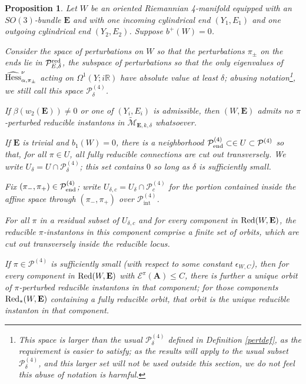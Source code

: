 \documentclass{memo-l}
\newtheorem{proposition}[theorem]{Proposition}
\theoremstyle{definition}
\theoremstyle{remark}
\numberwithin{section}{chapter}
\numberwithin{equation}{chapter}
\begin{document}
\begin{proposition}\label{red-solutions-nobplus}Let $W$ be an oriented Riemannian 4-manifold equipped with an $SO(3)$-bundle $\mathbf{E}$ and with one incoming cylindrical end $(Y_1,E_1)$ and one outgoing cylindrical end $(Y_2, E_2)$. Suppose $b^+(W) = 0$.

Consider the space of perturbations on $W$ so that the perturbations $\pi_\pm$ on the ends lie in $\mathcal P^{\textup{red}}_{E,\delta}$, the subspace of perturbations so that the only eigenvalues of $\widehat{\textup{Hess}}^\nu_{\alpha, \pi_\pm}$ acting on $\Omega^1(Y;i\mathbb R)$ have absolute value at least $\delta$; abusing notation\footnote{This space is larger than the usual $\mathcal P^{(4)}_\delta$ defined in Definition \ref{pertdef}, as the requirement is easier to satisfy; as the results will apply to the usual subset $\mathcal P^{(4)}_\delta$, and this larger set will not be used outside this section, we do not feel this abuse of notation is harmful.}, we still call this space $\mathcal P^{(4)}_\delta$.

If $\beta(w_2(\mathbf{E})) \neq 0$ or one of $(Y_i, E_i)$ is admissible, then $(W,\mathbf{E})$ admits no $\pi$-perturbed reducible instantons in $\widetilde{\mathcal M}_{\mathbf{E},k,\delta}$ whatsoever.

If $\mathbf{E}$ is trivial and $b_1(W) = 0$, there is a neighborhood $\mathcal P^{(4)}_{\textup{end}} \subset \in U \subset \mathcal P^{(4)}$ so that, for all $\pi \in U$, all fully reducible connections are cut out transversely. We write $U_\delta = U \cap \mathcal P^{(4)}_\delta$; this set contains $0$ so long as $\delta$ is sufficiently small. 

Fix $(\pi_-, \pi_+) \in \mathcal P^{(4)}_{\textup{end}}$; write $U_{\delta, c} = U_\delta \cap \mathcal P^{(4)}_c$ for the portion contained inside the affine space through $(\pi_-, \pi_+)$ over $\mathcal P^{(4)}_{\text{int}}$. 

For all $\pi$ in a residual subset of $U_{\delta,c}$ and for every component in $\textup{Red}(W,\mathbf{E})$, the reducible $\pi$-instantons in this component comprise a finite set of orbits, which are cut out transversely inside the reducible locus. 

If $\pi\in \mathcal P^{(4)}$ is sufficiently small (with respect to some constant $\epsilon_{W,C}$), then for every component in $\textup{Red}(W,\mathbf{E})$ with $\mathcal E^\pi(\mathbf{A}) \leq C$, there is further a unique orbit of $\pi$-perturbed reducible instantons in that component; for those components $\textup{Red}_*(W,\mathbf{E})$ containing a fully reducible orbit, that orbit is the unique reducible instanton in that component.
\end{proposition}
\end{document}
